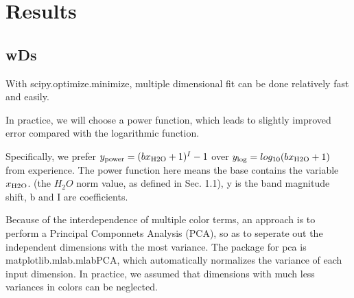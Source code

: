 \begin{comment}
\documentclass[a4paper,12pt]{article}
\usepackage{comment}
\usepackage{import}


\usepackage{xspace} 
\usepackage{graphicx}
\usepackage{subfig}
\usepackage{float}
\usepackage{placeins}
\usepackage[document]{ragged2e}
\usepackage{amsmath}
\usepackage{mathtools}

\DeclareGraphicsExtensions{.pdf,.png}
\graphicspath{{/home/bruno/users/weh40/Pictures/}}
\newcommand{\citp}{/home/bruno/users/weh40/sims_phosim/data/SEDs/SEDs/back/}
\newcommand{\fa}{BD_H2O_1/}
\newcommand{\fb}{BD_O3_1run/}
\newcommand{\fc}{BD_O2_1run/}
\newcommand{\fd}{H2O-new_4run-img/}
\newcommand{\fe}{H2O-aperture_1run/}
\newcommand{\ff}{O3_2run-100/}
\newcommand{\fg}{O2_1run/}
\newcommand{\R0}{Intcolors/tpxall_R0_order0/}
\let\oldtabular\tabular
\renewcommand{\tabular}{\footnotesize\oldtabular}
\usepackage{amsmath}

\end{comment}


\section{Results}

\subsection{wDs}


With scipy.optimize.minimize, multiple dimensional fit can be done relatively fast and easily.

In practice, we will choose a power function, which leads to slightly improved error compared with the logarithmic function. 

Specifically, we prefer $y_{\rm power} = (bx_{\rm H2O}+1)^I -1$ over $y_{\rm log} = log_{10}(bx_{\rm H2O}+1)$ from experience. The power function here means the base contains the variable $x_{\rm H2O}$. (the $H_2O$ norm value, as defined in Sec. 1.1), y is the band magnitude shift, b and I are coefficients.

Because of the interdependence of multiple color terms, an approach is to perform a Principal Componnets Analysis (PCA), so as to seperate out the independent dimensions with the most variance. The package for pca is matplotlib.mlab.mlabPCA, which automatically normalizes the variance of each input dimension. In practice, we assumed that dimensions with much less variances in colors can be neglected.

